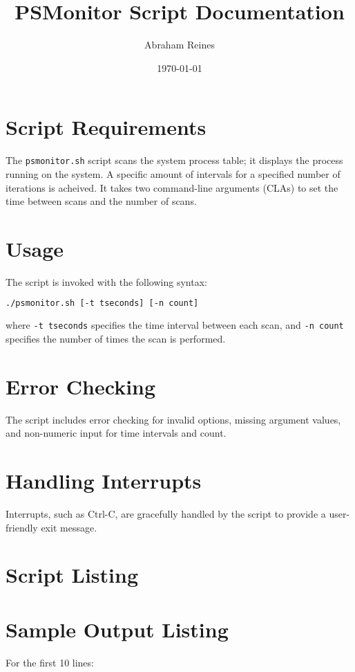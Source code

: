 \documentclass{article}
\title{PSMonitor Script Documentation}
\author{Abraham Reines}
\date{\today}
\begin{document}
\maketitle

\section{Script Requirements}
The \texttt{psmonitor.sh} script scans the system process table; it displays the process running on the system. A specific amount of intervals for a specified number of iterations is acheived. It takes two command-line arguments (CLAs) to set the time between scans and the number of scans.

\section{Usage}
The script is invoked with the following syntax:
\begin{lstlisting}[language=bash]
./psmonitor.sh [-t tseconds] [-n count]
\end{lstlisting}
where \texttt{-t tseconds} specifies the time interval between each scan, and \texttt{-n count} specifies the number of times the scan is performed.

\section{Error Checking}
The script includes error checking for invalid options, missing argument values, and non-numeric input for time intervals and count.

\section{Handling Interrupts}
Interrupts, such as Ctrl-C, are gracefully handled by the script to provide a user-friendly exit message.

\section{Script Listing}


\section{Sample Output Listing}
For the first 10 lines:

\end{document}
